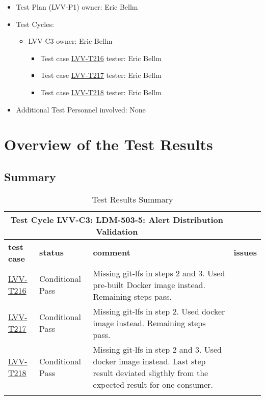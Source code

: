 \documentclass[DM,lsstdraft,STR,toc]{lsstdoc}
\begin{document}
\begin{itemize}
\item Test Plan (LVV-P1) owner: Eric Bellm
\item Test Cycles:
\begin{itemize}
  \item LVV-C3 owner: 
    Eric Bellm
  \begin{itemize}
    \item Test case \href{https://jira.lsstcorp.org/secure/Tests.jspa#/testCase/LVV-T216}{LVV-T216} tester: Eric Bellm
    \item Test case \href{https://jira.lsstcorp.org/secure/Tests.jspa#/testCase/LVV-T217}{LVV-T217} tester: Eric Bellm
    \item Test case \href{https://jira.lsstcorp.org/secure/Tests.jspa#/testCase/LVV-T218}{LVV-T218} tester: Eric Bellm
  \end{itemize}
\end{itemize}
\item Additional Test Personnel involved: None
\end{itemize}

\newpage

\section{Overview of the Test Results}
\label{sect:overview}

\subsection{Summary}
\label{sect:summarytable}

\begin{longtable}{p{}p{}p{}p{}}
\toprule
  \multicolumn{3}{c}{ Test Cycle {\bf LVV-C3: LDM-503-5: Alert Distribution Validation
 }} \\\hline
  {\bf \footnotesize test case} & {\bf \footnotesize status} & {\bf \footnotesize comment} & {\bf \footnotesize issues} \\\toprule
    \href{https://jira.lsstcorp.org/secure/Tests.jspa#/testCase/LVV-T216}{LVV-T216} 
    & Conditional Pass & Missing git-lfs in steps 2 and 3. Used pre-built Docker image instead.
Remaining steps pass.
 &
    \\\hline
    \href{https://jira.lsstcorp.org/secure/Tests.jspa#/testCase/LVV-T217}{LVV-T217} 
    & Conditional Pass & Missing git-lfs in step 2. Used docker image instead. Remaining steps
pass.
 &
    \\\hline
    \href{https://jira.lsstcorp.org/secure/Tests.jspa#/testCase/LVV-T218}{LVV-T218} 
    & Conditional Pass & Missing git-lfs in step 2 and 3. Used docker image instead. Last step
result deviated sligthly from the expected result for one consumer.
 &
    \\\hline

\caption{Test Results Summary}
\label{table:summary}
\end{longtable}
\end{document}
